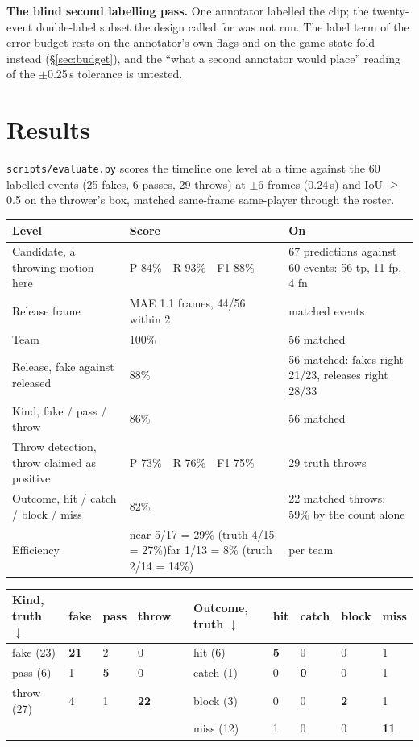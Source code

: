 \documentclass[10pt,a4paper]{article}
\begin{document}
\textbf{The blind second labelling pass.} One annotator labelled the clip; the twenty-event
double-label subset the design called for was not run. The label term of the error budget
rests on the annotator's own flags and on the game-state fold instead (\S\ref{sec:budget}),
and the ``what a second annotator would place'' reading of the $\pm$0.25\,s tolerance is
untested.

\section{Results}
\label{sec:results}

\texttt{scripts/evaluate.py} scores the timeline one level at a time against the 60
labelled events (25 fakes, 6 passes, 29 throws) at $\pm$6 frames (0.24\,s) and IoU
$\geq$ 0.5 on the thrower's box, matched same-frame same-player through the roster.

{\footnotesize
\begin{xltabular}{\textwidth}{L{40mm} L{54mm} X}
\toprule
\textbf{Level} & \textbf{Score} & \textbf{On}\\
\midrule
Candidate, a throwing motion here & P 84\%\ \ R 93\%\ \ F1 88\% & 67 predictions against 60 events: 56 tp, 11 fp, 4 fn\\
Release frame & MAE 1.1 frames, 44/56 within 2 & matched events\\
Team & 100\% & 56 matched\\
Release, fake against released & 88\% & 56 matched: fakes right 21/23, releases right 28/33\\
Kind, fake / pass / throw & 86\% & 56 matched\\
Throw detection, throw claimed as positive & P 73\%\ \ R 76\%\ \ F1 75\% & 29 truth throws\\
Outcome, hit / catch / block / miss & 82\% & 22 matched throws; 59\% by the count alone\\
Efficiency & near 5/17 = 29\% (truth 4/15 = 27\%)\newline far 1/13 = 8\% (truth 2/14 = 14\%) & per team\\
\bottomrule
\end{xltabular}}

{\footnotesize
\begin{xltabular}{\textwidth}{L{26mm} R{10mm} R{10mm} R{10mm} L{4mm} L{26mm} R{9mm} R{9mm} R{9mm} R{9mm}}
\toprule
\textbf{Kind, truth $\downarrow$} & fake & pass & throw & & \textbf{Outcome, truth $\downarrow$} & hit & catch & block & miss\\
\midrule
fake (23) & \textbf{21} & 2 & 0 & & hit (6) & \textbf{5} & 0 & 0 & 1\\
pass (6) & 1 & \textbf{5} & 0 & & catch (1) & 0 & \textbf{0} & 0 & 1\\
throw (27) & 4 & 1 & \textbf{22} & & block (3) & 0 & 0 & \textbf{2} & 1\\
 & & & & & miss (12) & 1 & 0 & 0 & \textbf{11}\\
\bottomrule
\end{xltabular}}
\end{document}
